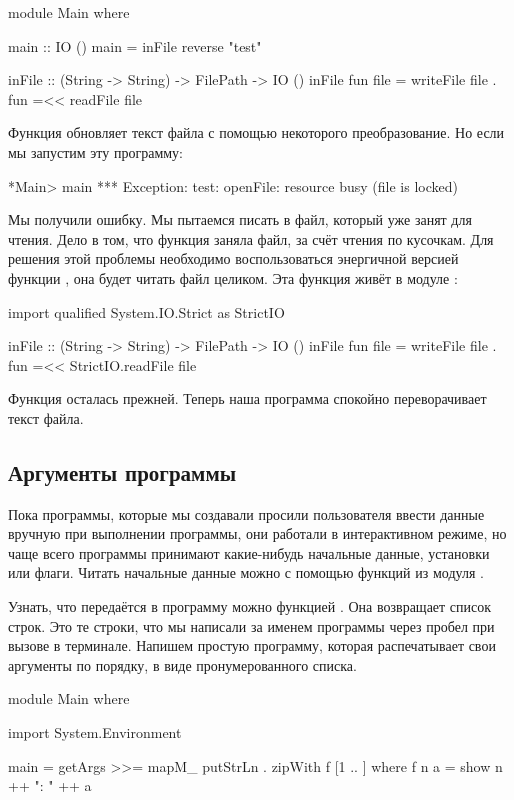 \begin{code}
module Main where

main :: IO ()
main = inFile reverse "test"

inFile :: (String -> String) -> FilePath -> IO ()
inFile fun file = writeFile file . fun =<< readFile file
\end{code}

Функция  обновляет текст файла с помощью некоторого
преобразование. Но если мы запустим эту программу:

\begin{code}
*Main> main
*** Exception: test: openFile: resource busy (file is locked)
\end{code}

Мы получили ошибку. Мы пытаемся писать в файл, который
уже занят для чтения. Дело в том, что функция 
заняла файл, за счёт чтения по кусочкам. Для решения этой
проблемы необходимо воспользоваться энергичной версией
функции , она будет читать файл целиком. 
Эта функция живёт в модуле :

\begin{code}
import qualified System.IO.Strict as StrictIO

inFile :: (String -> String) -> FilePath -> IO ()
inFile fun file = writeFile file . fun =<< StrictIO.readFile file
\end{code}

Функция  осталась прежней. Теперь наша программа
спокойно переворачивает текст файла.


\subsection{Аргументы программы}

Пока программы, которые мы создавали просили пользователя 
ввести данные вручную при выполнении программы,
они работали в интерактивном режиме, но чаще всего программы
принимают какие-нибудь начальные данные, установки или флаги. 
Читать начальные данные можно с помощью функций из модуля 
. 

Узнать, что передаётся в программу можно функцией 
. Она возвращает список строк. Это те строки, что
мы написали за именем программы через пробел при вызове в терминале.
Напишем простую программу, которая распечатывает свои аргументы
по порядку, в виде пронумерованного списка.

\begin{code}
module Main where

import System.Environment

main = getArgs >>= mapM_ putStrLn . zipWith f [1 .. ]
    where f n a = show n ++ ": " ++ a
\end{code}

